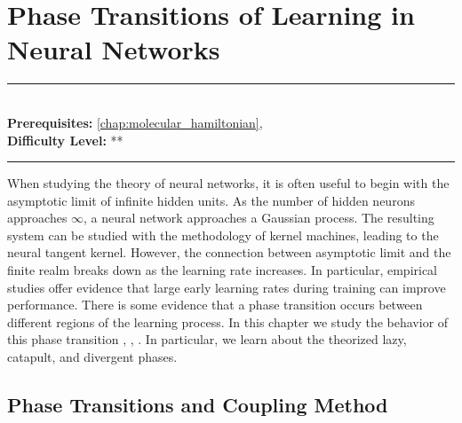 \documentclass[book.tex]{subfiles}
\begin{document}
\chapter{Phase Transitions of Learning in Neural Networks}
\label{chap:phase_neural}
\noindent\rule{11cm}{0.4pt} \\
\textbf{Prerequisites:}  \autoref{chap:molecular_hamiltonian},   \\
\textbf{Difficulty Level:} ** \\
\noindent\rule{11cm}{0.4pt}
\vspace{5mm}

When studying the theory of neural networks, it is often useful to begin with the asymptotic limit of infinite hidden units. As the number of hidden neurons approaches $\infty$, a neural network approaches a Gaussian process. The resulting system can be studied with the methodology of kernel machines, leading to the neural tangent kernel. However, the connection between asymptotic limit and the finite realm breaks down as the learning rate increases. In particular, empirical studies offer evidence that large early learning rates during training can improve performance. There is some evidence that a phase transition occurs between different regions of the learning process. In this chapter we study the behavior of this phase transition \cite{bahri2020statistical}, \cite{lee2017deep}, \cite{lewkowycz2020large}. In particular, we learn about the theorized lazy, catapult, and divergent phases.




\section{Phase Transitions and Coupling Method}
\end{document}
